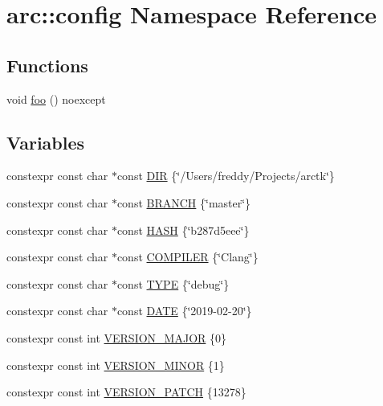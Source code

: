 \hypertarget{namespacearc_1_1config}{}\section{arc\+::config Namespace Reference}
\label{namespacearc_1_1config}
\subsection*{Functions}
\begin{DoxyCompactItemize}
\item 
void \mbox{\hyperlink{namespacearc_1_1config_abdd5627a0a104f77f03efd18d2342ac9}{foo}} () noexcept
\end{DoxyCompactItemize}
\subsection*{Variables}
\begin{DoxyCompactItemize}
\item 
constexpr const char $\ast$const \mbox{\hyperlink{namespacearc_1_1config_a16772240b2bebb3714996f868cb42256}{D\+IR}} \{\char`\"{}/Users/freddy/Projects/arctk\char`\"{}\}
\item 
constexpr const char $\ast$const \mbox{\hyperlink{namespacearc_1_1config_a8e30a8a92602b7af3d1aa1281277d630}{B\+R\+A\+N\+CH}} \{\char`\"{}master\char`\"{}\}
\item 
constexpr const char $\ast$const \mbox{\hyperlink{namespacearc_1_1config_ac3fe39d64aae861ea79d304341332f28}{H\+A\+SH}} \{\char`\"{}b287d5eee\char`\"{}\}
\item 
constexpr const char $\ast$const \mbox{\hyperlink{namespacearc_1_1config_a1a2ea0c0efab402ce44cf50e556eb48d}{C\+O\+M\+P\+I\+L\+ER}} \{\char`\"{}Clang\char`\"{}\}
\item 
constexpr const char $\ast$const \mbox{\hyperlink{namespacearc_1_1config_ad3c57f6f957765d78d8eef78dfe3251a}{T\+Y\+PE}} \{\char`\"{}debug\char`\"{}\}
\item 
constexpr const char $\ast$const \mbox{\hyperlink{namespacearc_1_1config_a8f0a1dcf46a9a3101d9cced88635582b}{D\+A\+TE}} \{\char`\"{}2019-\/02-\/20\char`\"{}\}
\item 
constexpr const int \mbox{\hyperlink{namespacearc_1_1config_a6b833939cb69b12a34746425eb3fd6cc}{V\+E\+R\+S\+I\+O\+N\+\_\+\+M\+A\+J\+OR}} \{0\}
\item 
constexpr const int \mbox{\hyperlink{namespacearc_1_1config_a5518e18fcfc6399d19e9f67464964320}{V\+E\+R\+S\+I\+O\+N\+\_\+\+M\+I\+N\+OR}} \{1\}
\item 
constexpr const int \mbox{\hyperlink{namespacearc_1_1config_aef9d6e2bb18cb78ca941ab4483c5e6f3}{V\+E\+R\+S\+I\+O\+N\+\_\+\+P\+A\+T\+CH}} \{13278\}
\end{DoxyCompactItemize}


